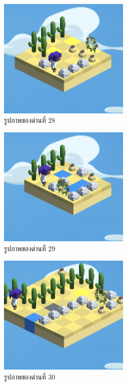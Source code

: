 \begin{figure}[H]
    \begin{center}
    \includegraphics[width=2.5in]{pic-toro/stage/s28.png}
    \end{center}
    \caption[รูปภาพของด่านที่ 28]{รูปภาพของด่านที่ 28}
    \label{s28}
\end{figure}
\begin{figure}[H]
    \begin{center}
    \includegraphics[width=2.5in]{pic-toro/stage/s29.png}
    \end{center}
    \caption[รูปภาพของด่านที่ 29]{รูปภาพของด่านที่ 29}
    \label{s29}
\end{figure}
\begin{figure}[H]
    \begin{center}
    \includegraphics[width=2.5in]{pic-toro/stage/s30.png}
    \end{center}
    \caption[รูปภาพของด่านที่ 30]{รูปภาพของด่านที่ 30}
    \label{s30}
\end{figure}
\pagebreak
